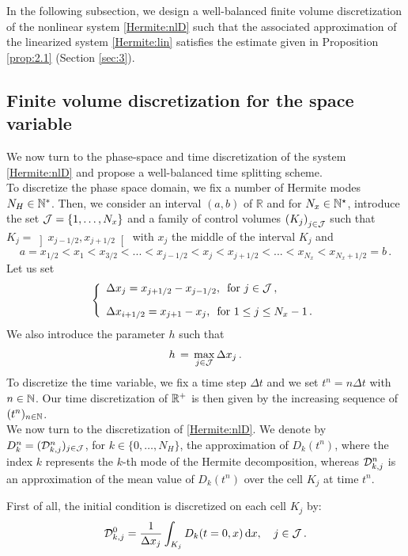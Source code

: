 \documentclass[11pt]{amsart}
\numberwithin{equation}{section}
\numberwithin{figure}{section}
\begin{document}
In the following subsection, we design a well-balanced finite volume discretization of
the nonlinear system \eqref{Hermite:nlD} such that the associated
approximation of the linearized system \eqref{Hermite:lin} satisfies the estimate given in Proposition \ref{prop:2.1} (Section \ref{sec:3}). 

\subsection{Finite volume discretization for the space variable}
We now turn to the phase-space and time discretization of the system
\eqref{Hermite:nlD} and propose a well-balanced time splitting
scheme. \\
To discretize the phase space domain, we fix a number of Hermite modes $N_H\in{\mathbb N}^*$. Then, we consider an interval $(a,b)$ of $
\mathbb{R}$ and for $N_{x}\in{\mathbb N}^\star$, introduce the set
${\mathcal J}=\{1,\ldots, N_x\}$ and a family of control volumes
$\left(K_{j}\right)_{j\in{\mathcal J}}$ such that
$K_{j}=\left]x_{j-{1}/{2}},x_{j+{1}/{2}}\right[$ with $x_{j}$ the
middle of the interval $K_j$ and 
\begin{equation*}
a=x_{{1}/{2}}<x_{1}<x_{{3}/{2}}<...<x_{j-{1}/{2}}<x_{j}<x_{j+{1}/{2}}<...<x_{N_{x}}<x_{N_{x}+{1}/{2}}=b\,.
\end{equation*}
Let us set
$$
\left\{
  \begin{array}{l}
\displaystyle\Delta x_{j}=x_{j+{1}/{2}}-x_{j-{1}/{2}}, \,\text{ for } j \in{\mathcal J}\,,
\\[0.9em]
\displaystyle\Delta x_{i+{1}/{2}} = x_{j+1}-x_{j}, \,\text{ for } 1 \leq j \leq N_{x}-1\,.
  \end{array}\right.
$$
We also introduce the parameter $h$ such that
$$
h \,=\, \max_{j \in{\mathcal J}} \Delta x_j\,.
$$
To discretize the time variable, we fix a time step $ \Delta t$ and we set $t^{n}=n \Delta t$ with
$n\in{\mathbb N}$. Our time discretization of ${\mathbb R}^+$ is then given by the
increasing sequence of $(t^{n})_{n \in{\mathbb N}}$. \\
We now turn to the discretization of \eqref{Hermite:nlD}. We denote by $D_k^n=({\mathcal D}^n_{k,j})_{j\in{\mathcal J}}$, for $k\in\{0,\ldots,N_H\}$, the approximation of $D_k(t^n)$, where the index $k$
represents the $k$-th mode of the Hermite decomposition, whereas
${\mathcal D}_{k,j}^n$ is an approximation of the mean value of $D_k(t^n)$
over the cell $K_{j}$ at time $t^n$.


First of all, the initial condition is discretized on each cell $K_{j}$ by:
\begin{equation*}
{\mathcal D}_{k,j}^{0}=\frac{1}{\Delta x_{j}}\int_{K_{j}}D_{k}(t=0,x)\, \mathrm{d} x, \quad j\in{\mathcal J}\,.
\end{equation*}
\end{document}

